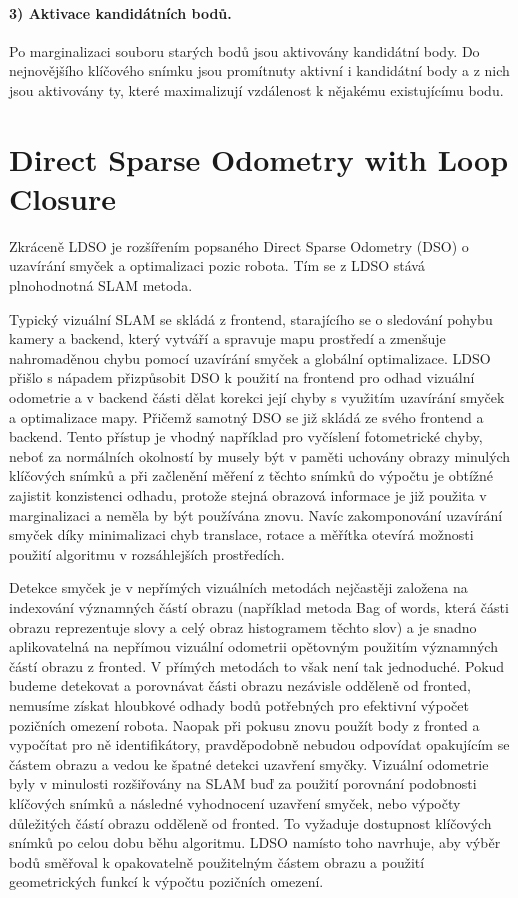 \documentclass[12pt,a4paper]{report}
\begin{document}
\paragraph*{3) Aktivace kandidátních bodů.} Po marginalizaci souboru starých bodů jsou aktivovány kandidátní body. Do nejnovějšího klíčového snímku jsou promítnuty aktivní i kandidátní body a z nich jsou aktivovány ty, které maximalizují vzdálenost k nějakému existujícímu bodu.

\section{Direct Sparse Odometry with Loop Closure}
Zkráceně LDSO je rozšířením popsaného Direct Sparse Odometry (DSO) o uzavírání smyček a optimalizaci pozic robota. Tím se z LDSO stává plnohodnotná SLAM metoda.

Typický vizuální SLAM se skládá z frontend, starajícího se o sledování pohybu kamery a backend, který vytváří a spravuje mapu prostředí a zmenšuje nahromaděnou chybu pomocí uzavírání smyček a globální optimalizace. LDSO přišlo s nápadem přizpůsobit DSO k použití na frontend pro odhad vizuální odometrie a v backend části dělat korekci její chyby s využitím uzavírání smyček a optimalizace mapy. Přičemž samotný DSO se již skládá ze svého frontend a backend. Tento přístup je vhodný například pro vyčíslení fotometrické chyby, neboť za normálních okolností by musely být v paměti uchovány obrazy minulých klíčových snímků a při začlenění měření z těchto snímků do výpočtu je obtížné zajistit konzistenci odhadu, protože stejná obrazová informace je již použita v marginalizaci a neměla by být používána znovu. Navíc zakomponování uzavírání smyček díky minimalizaci chyb translace, rotace a měřítka otevírá možnosti použití algoritmu v rozsáhlejších prostředích.

Detekce smyček je v nepřímých vizuálních metodách nejčastěji založena na indexování významných částí obrazu (například metoda Bag of words, která části obrazu reprezentuje slovy a celý obraz histogramem těchto slov) a je snadno aplikovatelná na nepřímou vizuální odometrii opětovným použitím významných částí obrazu z fronted. V přímých metodách to však není tak jednoduché. Pokud budeme detekovat a porovnávat části obrazu nezávisle odděleně od fronted, nemusíme získat hloubkové odhady bodů potřebných pro efektivní výpočet pozičních omezení robota. Naopak při pokusu znovu použít body z fronted a vypočítat pro ně identifikátory, pravděpodobně nebudou odpovídat opakujícím se částem obrazu a vedou ke špatné detekci uzavření smyčky. Vizuální odometrie byly v minulosti rozšiřovány na SLAM buď za použití porovnání podobnosti klíčových snímků a následné vyhodnocení uzavření smyček, nebo výpočty důležitých částí obrazu odděleně od fronted. To vyžaduje dostupnost klíčových snímků po celou dobu běhu algoritmu. LDSO namísto toho navrhuje, aby výběr bodů směřoval k opakovatelně použitelným částem obrazu a použití geometrických funkcí k výpočtu pozičních omezení.
\end{document}
